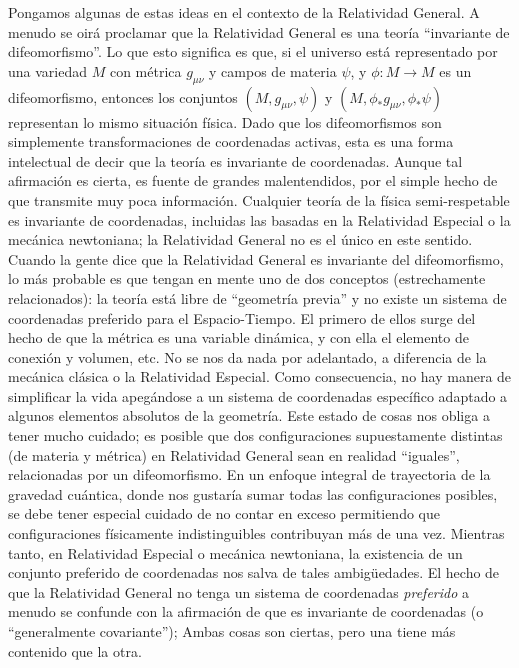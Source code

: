 \documentclass[11pt,b5paper,openany,twoside]{book}
\newcommand{\mn}{{\mu\nu}}
\begin{document}
Pongamos algunas de estas ideas en el contexto de la Relatividad General.
A menudo se oirá proclamar que la Relatividad General es una teoría ``invariante de difeomorfismo''.
Lo que esto significa es que, si el universo está representado por una variedad $M$ con métrica $g_\mn$ y campos de materia $\psi$, y $\phi:M\rightarrow M$ es un difeomorfismo, entonces los conjuntos $(M,g_\mn,\psi)$ y $(M, \phi_*g_\mn,\phi_*\psi)$ representan lo mismo situación física.
Dado que los difeomorfismos son simplemente transformaciones de coordenadas activas, esta es una forma intelectual de decir que la teoría es invariante de coordenadas.
Aunque tal afirmación es cierta, es fuente de grandes malentendidos, por el simple hecho de que transmite muy poca información.
Cualquier teoría de la física semi-respetable es invariante de coordenadas, incluidas las basadas en la Relatividad Especial o la mecánica newtoniana; la Relatividad General no es el único en este sentido.
Cuando la gente dice que la Relatividad General es invariante del difeomorfismo, lo más probable es que tengan en mente uno de dos conceptos (estrechamente relacionados): la teoría está libre de ``geometría previa'' y no existe un sistema de coordenadas preferido para el Espacio-Tiempo.
El primero de ellos surge del hecho de que la métrica es una variable dinámica, y con ella el elemento de conexión y volumen, etc.
No se nos da nada por adelantado, a diferencia de la mecánica clásica o la Relatividad Especial.
Como consecuencia, no hay manera de simplificar la vida apegándose a un sistema de coordenadas específico adaptado a algunos elementos absolutos de la geometría.
Este estado de cosas nos obliga a tener mucho cuidado; es posible que dos configuraciones supuestamente distintas (de materia y métrica) en Relatividad General sean en realidad ``iguales'', relacionadas por un difeomorfismo.
En un enfoque integral de trayectoria de la gravedad cuántica, donde nos gustaría sumar todas las configuraciones posibles, se debe tener especial cuidado de no contar en exceso permitiendo que configuraciones físicamente indistinguibles contribuyan más de una vez.
Mientras tanto, en Relatividad Especial o mecánica newtoniana, la existencia de un conjunto preferido de coordenadas nos salva de tales ambigüedades.
El hecho de que la Relatividad General no tenga un sistema de coordenadas {\it preferido} a menudo se confunde con la afirmación de que es invariante de coordenadas (o ``generalmente covariante''); Ambas cosas son ciertas, pero una tiene más contenido que la otra.
\end{document}
